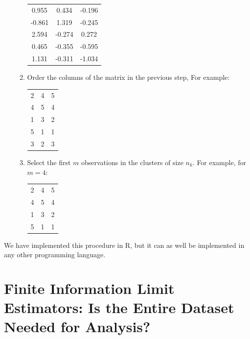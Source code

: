 \documentclass[11pt,a5paper,twoside]{book}
\begin{document}
\begin{enumerate}
\begin{enumerate}
\begin{center}
		\begin{tabular}{ccc}
			 0.955 & 0.434 & -0.196 \\ 
			 -0.861 & 1.319 & -0.245 \\ 
			 2.594 & -0.274 & 0.272 \\ 
			 0.465 & -0.355 & -0.595 \\ 
			 1.131 & -0.311 & -1.034 
		\end{tabular}
	\end{center}
		\item Order the columns of the matrix in the previous step, For example:
		\begin{center}
		\begin{tabular}{ccc}
	   2 &   4 &   5 \\ 
	   4 &   5 &   4 \\ 
	   1 &   3 &   2 \\ 
	   5 &   1 &   1 \\ 
	   3 &   2 &   3 
		\end{tabular}
	\end{center}	
	\item 	Select the first $m$ observations in the clusters of size $n_k$. For example, for $m=4$:
		\begin{center}
		\begin{tabular}{ccc}
			2 &   4 &   5 \\ 
			4 &   5 &   4 \\ 
			1 &   3 &   2 \\ 
			5 &   1 &   1 
		\end{tabular}
	\end{center}	
	\end{enumerate}
\end{enumerate}

We have implemented this procedure in R, but it can as well be implemented in any other programming language.


\section[Finite Information Limit Estimators]{Finite Information Limit Estimators: Is the Entire Dataset Needed for Analysis?}

\label{chap_FIL}
\end{document}
